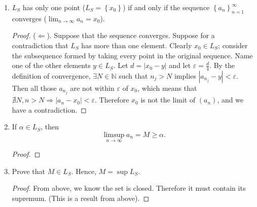 \documentclass{article}
\newcommand{\N}{\mathbb{N}}
\newcommand{\abs}[1]{\left| #1 \right|}
\newcommand{\set}[1]{\left\{ #1 \right\}}
\begin{document}
\begin{enumerate}
\begin{proof}
    \end{proof}


    \item 
    $L_S$ has only one point ($L_S = \set{x_0}$) if and only if the sequence $\set{a_n}_{n = 1}^\infty$ converges ($\lim_{n \to \infty} a_n = x_0$).
    \begin{proof}



        ($\Longleftarrow$). Suppose that the sequence converges. Suppose for a contradiction that $L_S$ has more than one element. Clearly $x_0 \in L_S$; consider the subsequence formed by taking every point in the original sequence. Name one of the other elements $y \in L_S$. Let $d = \abs{x_0 - y}$ and let $\varepsilon = \frac{d}{4}$. By the definition of convergence, $\exists N \in \N$ such that $n_j > N$ implies $|a_{n_j} - y| < \varepsilon$. Then all those $a_{n_j}$ are not within $\varepsilon$ of $x_0$, which means that $\nexists N, n > N \Rightarrow \abs{a_n - x_0} < \varepsilon$. Therefore $x_0$ is not the limit of $(a_n)$, and we have a contradiction.
    \end{proof}







    \item 
    If $\alpha \in L_S$, then
    $$\limsup_{n \to \infty} a_n = M \ge \alpha.$$
    \begin{proof}
        
    \end{proof}


    \item 
    Prove that $M \in L_S$. Hence, $M = \sup L_S$.
    \begin{proof}
        From above, we know the set is closed. Therefore it must contain its supremum. (This is a result from above). 
    \end{proof}

\end{enumerate}
\end{document}
